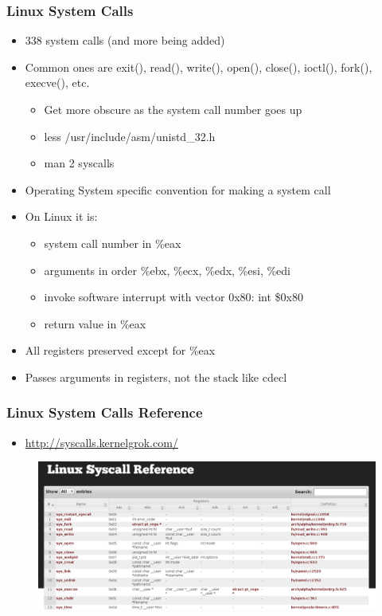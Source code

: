 \documentclass[11pt,xcolor=dvipsnames]{beamer}
\newcommand{\mvs}{\vspace{-0.95em}}
\begin{document}
\begin{frame}[fragile,t]
\frametitle{Linux System Calls}
\mvs
\begin{itemize}
  \item 338 system calls (and more being added)
  \item Common ones are {\ttfamily exit(), read(), write(), open(), close(), ioctl(), fork(), execve()}, etc.
  \pause
  \begin{itemize}
  \item Get more obscure as the system call number goes up
  \item {\ttfamily less /usr/include/asm/unistd\_32.h}
  \item {\ttfamily man 2 syscalls}
  \end{itemize}
  \pause
  \item Operating System specific convention for making a system call
  \item On Linux it is:
  \begin {itemize}
    \item system call number in {\ttfamily \%eax}
    \item arguments in order {\ttfamily \%ebx, \%ecx, \%edx, \%esi, \%edi}
    \item invoke software interrupt with vector {\ttfamily 0x80}: {\ttfamily int \$0x80}
    \item return value in \%eax
  \end{itemize}
  \item All registers preserved except for {\ttfamily \%eax}
  \item Passes arguments in registers, not the stack like {\ttfamily cdecl}
\end{itemize}
\end{frame}

\begin{frame}[fragile,t]
\frametitle{Linux System Calls Reference}
\begin{itemize}
  \item \url{http://syscalls.kernelgrok.com/}
\end{itemize}
\begin{figure}
\centering
\includegraphics[height=0.50\paperheight]{figures/syscalls.png}
\end{figure}
\end{frame}
\end{document}

